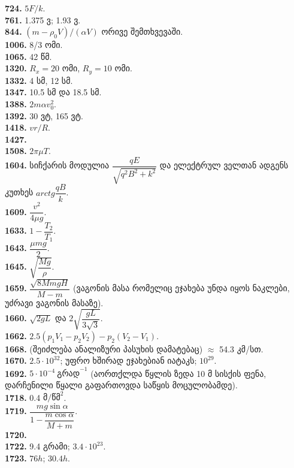 \documentclass[12pt,a4paper,]{report}
\begin{document}
\textbf{724.} $5F/k$. \\
\textbf{761.} 1.375 ვ; 1.93 ვ. \\
\textbf{844.} $(m-\rho_0 V)/(\alpha V)$ ორივე შემთხვევაში.\\
\textbf{1006.} 8/3 ომი. \\
\textbf{1065.} 42 წმ. \\
\textbf{1320.} $R_x=20$ ომი, $R_y=10$ ომი.\\
\textbf{1332.} 4 სმ, 12 სმ. \\
\textbf{1347.} 10.5 სმ და 18.5 სმ. \\
\textbf{1388.} $2m\alpha v_0^2$. \\
\textbf{1392.} 30 ვტ, 165 ვტ. \\
\textbf{1418.} $vr/R$. \\
\textbf{1427.} \\
\textbf{1508.} $2\pi\mu T$. \\
\textbf{1604.} სიჩქარის მოდულია $\dfrac{qE}{\sqrt{q^2B^2 + k^2}}$ და ელექტრულ ველთან ადგენს კუთხეს $arctg\dfrac{qB}{k}$. \\
\textbf{1609.} $\dfrac{v^2}{4\mu g}$. \\
\textbf{1633.} $1-\dfrac{T_2}{T_1}$. \\
\textbf{1643.} $\dfrac{\mu m g}{2}$. \\
\textbf{1645.} $\sqrt{\dfrac{Mg}{\rho}}$. \\
\textbf{1659.} $\dfrac{\sqrt{8MmgH}}{M - m}$ (ვაგონის მასა რომელიც ეჯახება უნდა იყოს ნაკლები, უძრავი ვაგონის მასაზე). \\
\textbf{1660.} $\sqrt{2gL}$ და $2\sqrt{\dfrac{gL}{3\sqrt{3}}}$. \\
\textbf{1662.} $2.5(p_1 V_1 - p_2 V_2) - p_2(V_2 - V_1)$. \\
\textbf{1668.} (შეიძლება ანალიზური პასუხის დამატებაც) $\approx$ 54.3 კმ/სთ. \\
\textbf{1670.} $2.5 \cdot 10^{32}$; უფრო ხშირად ეჯახებიან იატაკს; $10^{29}$. \\
\textbf{1692.} $5 \cdot 10^{-4}\ \text{გრად}^{-1}$ (აორთქლდა წყლის ზედა 10 მ სისქის ფენა, დარჩენილი წყალი გაფართოვდა საწყის მოცულობამდე).\\
\textbf{1718.} 0.4 $\text{მ}/\text{წმ}^2$. \\
\textbf{1719.} $\dfrac{mg\sin\alpha}{1-\dfrac{m\cos\alpha}{M+m}}$. \\
\textbf{1720.} \\
\textbf{1722.} 9.4 გრამი; $3.4 \cdot 10^{23}$.\\
\textbf{1723.} $76h$; $30.4h$.\\
\end{document}
